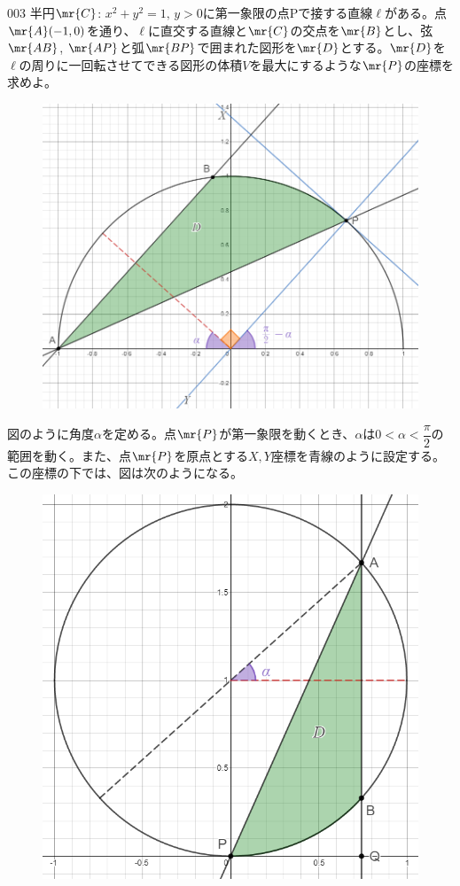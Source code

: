 \begin{thm}{003}{}{}
 半円$\mr{C}$: $x^2+y^2=1,\, y>0$に第一象限の点Pで接する直線$\ell$がある。点$\mr{A}(-1,0)$を通り、$\ell$に直交する直線と$\mr{C}$の交点を$\mr{B}$とし、弦$\mr{AB}$, $\mr{AP}$と弧$\mr{BP}$で囲まれた図形を$\mr{D}$とする。$\mr{D}$を$\ell$の周りに一回転させてできる図形の体積$V$を最大にするような$\mr{P}$の座標を求めよ。
\end{thm}

\begin{figure}[H]
 \centering
 \includegraphics[width=0.7\linewidth]{../problems/Q_003/A_003_1.png}
\end{figure}

図のように角度$\alpha$を定める。点$\mr{P}$が第一象限を動くとき、$\alpha$は$0<\alpha<\dfrac{\pi}{2}$の範囲を動く。また、点$\mr{P}$を原点とする$X, Y$座標を青線のように設定する。この座標の下では、図は次のようになる。

\begin{figure}[H]
 \centering
 \includegraphics[width=0.6\linewidth]{../problems/Q_003/A_003_2.png}
\end{figure}

